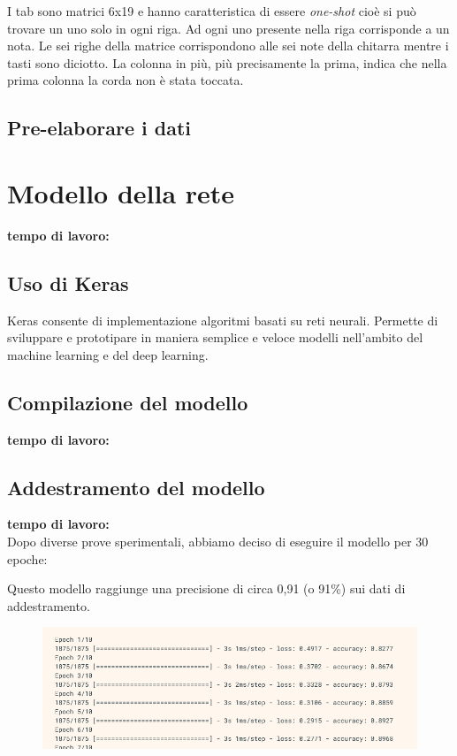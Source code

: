 I tab sono matrici 6x19 e hanno caratteristica di essere \textit{one-shot} cioè si può trovare un uno solo in ogni riga. Ad ogni uno presente nella riga corrisponde a un nota. Le sei righe della matrice corrispondono alle sei note della chitarra mentre i tasti sono diciotto. La colonna in più, più precisamente la prima, indica che nella prima colonna la corda non è stata toccata.

\subsection{Pre-elaborare i dati}


\section{Modello della rete}
\textbf{tempo di lavoro:} \\
\newline
\subsection{Uso di Keras}
Keras consente di implementazione algoritmi basati su reti neurali. Permette di sviluppare e prototipare in maniera semplice e veloce modelli nell’ambito del machine learning e del deep learning.\\

\subsection{Compilazione del modello}
\textbf{tempo di lavoro:} \\
\newline
{}
\subsection{Addestramento del modello}
\textbf{tempo di lavoro:} \\
\newline
Dopo diverse prove sperimentali, abbiamo deciso di eseguire il modello per 30 epoche:

Questo modello raggiunge una precisione di circa 0,91 (o 91\%) sui dati di addestramento.
\begin{figure}[H]
	\centering
	\includegraphics[scale=0.70]{./images/img5.png}
\end{figure}

